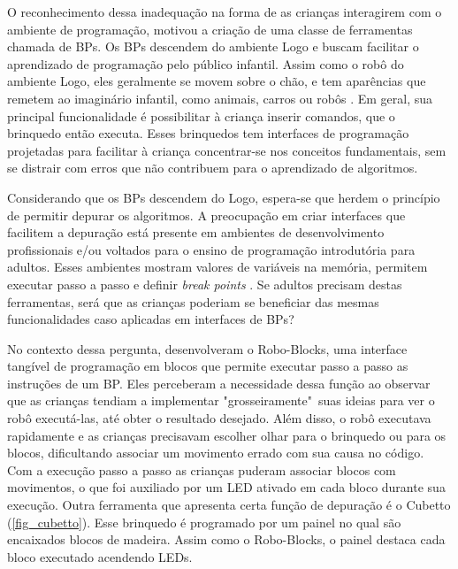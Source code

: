 O reconhecimento dessa inadequação na forma de as crianças interagirem com o ambiente de programação, motivou a criação de uma classe de ferramentas chamada de \ac{BPs}. Os \ac{BPs} descendem do ambiente Logo e buscam facilitar o aprendizado de programação pelo público infantil. Assim como o robô do ambiente Logo, eles geralmente se movem sobre o chão, e tem aparências que remetem ao imaginário infantil, como animais, carros ou robôs \cite{raabe_2017_rope}. Em geral, sua principal funcionalidade é possibilitar à criança inserir comandos, que o brinquedo então executa. Esses brinquedos tem interfaces de programação projetadas para facilitar à criança concentrar-se nos conceitos fundamentais, sem se distrair com erros que não contribuem para o aprendizado de algoritmos.

Considerando que os \ac{BPs} descendem do Logo, espera-se que herdem o princípio de permitir depurar os algoritmos. A preocupação em criar interfaces que facilitem a depuração está presente em ambientes de desenvolvimento profissionais e/ou voltados para o ensino de programação introdutória para adultos. Esses ambientes mostram valores de variáveis na memória, permitem executar passo a passo e definir \textit{break points} \cite{noschang_portugol_nodate}. Se adultos precisam destas ferramentas, será que as crianças poderiam se beneficiar das mesmas funcionalidades caso aplicadas em interfaces de \ac{BPs}?

No contexto dessa pergunta,  desenvolveram o Robo-Blocks, uma interface tangível de programação em blocos que permite executar passo a passo as instruções de um BP. Eles perceberam a necessidade dessa função ao observar que as crianças tendiam a implementar "grosseiramente"\ suas ideias para ver o robô executá-las, até obter o resultado desejado. Além disso, o robô executava rapidamente e as crianças precisavam escolher olhar para o brinquedo ou para os blocos, dificultando associar um movimento errado com sua causa no código. Com a execução passo a passo as crianças puderam associar blocos com movimentos, o que foi auxiliado por um LED ativado em cada bloco durante sua execução. Outra ferramenta que apresenta certa função de depuração é o Cubetto \cite{anzoategui_cubetto_2017} (\autoref{fig_cubetto}).  Esse brinquedo é programado por um painel no qual são encaixados blocos de madeira. Assim como o Robo-Blocks, o painel destaca cada bloco executado acendendo LEDs.

